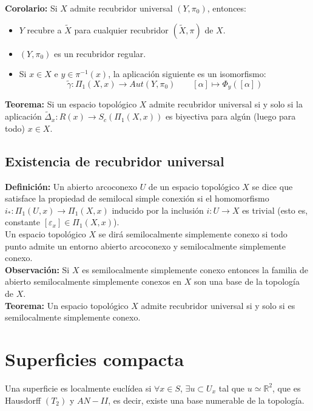 \documentclass{article}
\begin{document}
\textbf{Corolario:} Si $X$ admite recubridor universal $(Y,\pi_0)$, entonces:
\begin{itemize}
\item $Y$ recubre a $\tilde{X}$ para cualquier recubridor $(\tilde{X},\pi)$ de $X$.

\item $(Y,\pi_0)$ es un recubridor regular.

\item Si $x\in X$ e $y\in \pi^{-1}(x)$, la aplicación siguiente es un isomorfismo:
\begin{equation*}
\tilde{\gamma}:\Pi_1(X,x)\rightarrow Aut(Y,\pi_0)\qquad [\alpha]\mapsto \Phi_y([\alpha])
\end{equation*}
\end{itemize}

\textbf{Teorema:} Si un espacio topológico $X$ admite recubridor universal si y solo si la aplicación $\tilde{\Delta}_x:R(x)\rightarrow S_c(\Pi_1(X,x))$ es biyectiva para algún (luego para todo) $x\in X$. 

\subsection{Existencia de recubridor universal}
\textbf{Definición:} Un abierto arcoconexo $U$ de un espacio topológico $X$ se dice que satisface la propiedad de semilocal simple conexión si el homomorfismo $i_*:\Pi_1(U,x)\rightarrow \Pi_1(X,x)$ inducido por la inclusión $i:U\rightarrow X$ es trivial (esto es, constante $[\varepsilon_x]\in \Pi_1(X,x)$).\\

Un espacio topológico $X$ se dirá semilocalmente simplemente conexo si todo punto admite un entorno abierto arcoconexo y semilocalmente simplemente conexo.\\

\textbf{Observación:} Si $X$ es semilocalmente simplemente conexo entonces la familia de abierto semilocalmente simplemente conexos en $X$ son una base de la topología de $X$. \\

\textbf{Teorema:} Un espacio topológico $X$ admite recubridor universal si y solo si es semilocalmente simplemente conexo.

\section{Superficies compacta}
Una superficie es localmente euclídea si $\forall x\in S$, $\exists u\subset U_x$ tal que $u\simeq \mathbb{R}^2$, que es Hausdorff $(T_2)$ y $AN-II$, es decir, existe una base numerable de la topología.
\end{document}
